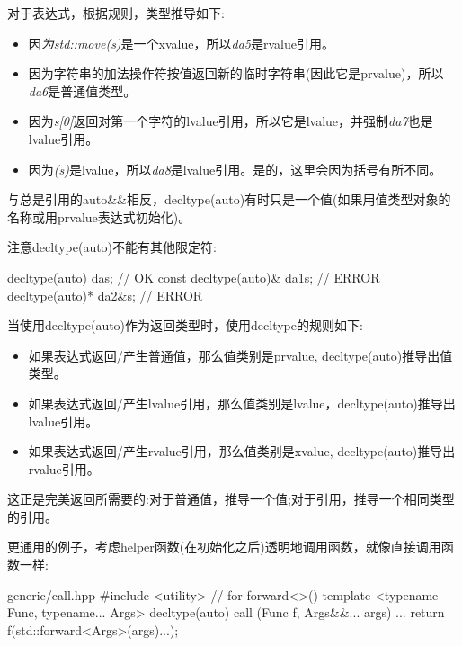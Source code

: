 对于表达式，根据规则，类型推导如下:\par

\begin{itemize}
  \item 因\textit{为std::\allowbreak{}move(\allowbreak{}s)\allowbreak{}}是一个xvalue，所以\textit{da5}是rvalue引用。
  \item 因为字符串的加法操作符按值返回新的临时字符串(因此它是prvalue)，所以\textit{da6}是普通值类型。
  \item 因为\textit{s[0]}返回对第一个字符的lvalue引用，所以它是lvalue，并强制\textit{da7}也是lvalue引用。
  \item 因为\textit{(s)}是lvalue，所以\textit{da8}是lvalue引用。是的，这里会因为括号有所不同。
\end{itemize}

与总是引用的auto\&\&相反，decltype(auto)有时只是一个值(如果用值类型对象的名称或用prvalue表达式初始化)。\par

注意decltype(auto)不能有其他限定符:\par

\begin{codebox}[cpp]
  decltype(auto) da{s}; // OK
  const decltype(auto)& da1{s}; // ERROR
  decltype(auto)* da2{&s}; // ERROR
\end{codebox}


当使用decltype(auto)作为返回类型时，使用decltype的规则如下:\par

\begin{itemize}
  \item 如果表达式返回/产生普通值，那么值类别是prvalue, decltype(auto)推导出值类型。
  \item 如果表达式返回/产生lvalue引用，那么值类别是lvalue，decltype(auto)推导出lvalue引用。
  \item 如果表达式返回/产生rvalue引用，那么值类别是xvalue, decltype(auto)推导出rvalue引用。
\end{itemize}

这正是完美返回所需要的:对于普通值，推导一个值;对于引用，推导一个相同类型的引用。\par

更通用的例子，考虑helper函数(在初始化之后)透明地调用函数，就像直接调用函数一样:\par

\begin{codeboxt}[cpp]{generic/call.hpp}
  #include <utility> // for forward<>()
  template <typename Func, typename... Args>
  decltype(auto) call (Func f, Args&&... args)
  {
    ...
    return f(std::forward<Args>(args)...);
  }
\end{codeboxt}

